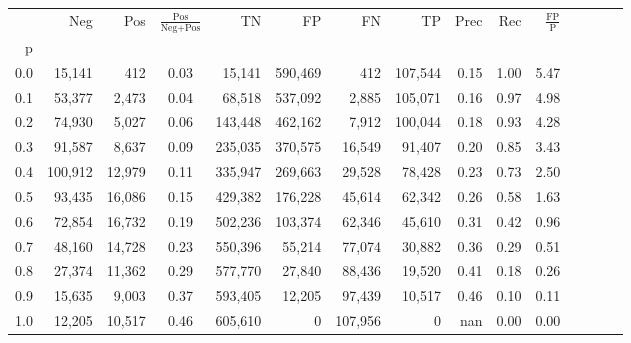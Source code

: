 \begin{tabular}{rrrcrrrrrrrrrrr}
\toprule
{} &      Neg &     Pos & $\frac{\text{Pos}}{\text{Neg}+\text{Pos}}$ &       TN &       FP &       FN &       TP &  Prec &   Rec & $\frac{\text{FP}}{\text{P}}$ \\
p   &          &         &                                            &          &          &          &          &       &       &                              \\
\midrule
0.0 &   15,141 &     412 &                                       0.03 &   15,141 &  590,469 &      412 &  107,544 &  0.15 &  1.00 &                         5.47 \\
0.1 &   53,377 &   2,473 &                                       0.04 &   68,518 &  537,092 &    2,885 &  105,071 &  0.16 &  0.97 &                         4.98 \\
0.2 &   74,930 &   5,027 &                                       0.06 &  143,448 &  462,162 &    7,912 &  100,044 &  0.18 &  0.93 &                         4.28 \\
0.3 &   91,587 &   8,637 &                                       0.09 &  235,035 &  370,575 &   16,549 &   91,407 &  0.20 &  0.85 &                         3.43 \\
0.4 &  100,912 &  12,979 &                                       0.11 &  335,947 &  269,663 &   29,528 &   78,428 &  0.23 &  0.73 &                         2.50 \\
0.5 &   93,435 &  16,086 &                                       0.15 &  429,382 &  176,228 &   45,614 &   62,342 &  0.26 &  0.58 &                         1.63 \\
0.6 &   72,854 &  16,732 &                                       0.19 &  502,236 &  103,374 &   62,346 &   45,610 &  0.31 &  0.42 &                         0.96 \\
0.7 &   48,160 &  14,728 &                                       0.23 &  550,396 &   55,214 &   77,074 &   30,882 &  0.36 &  0.29 &                         0.51 \\
0.8 &   27,374 &  11,362 &                                       0.29 &  577,770 &   27,840 &   88,436 &   19,520 &  0.41 &  0.18 &                         0.26 \\
0.9 &   15,635 &   9,003 &                                       0.37 &  593,405 &   12,205 &   97,439 &   10,517 &  0.46 &  0.10 &                         0.11 \\
1.0 &   12,205 &  10,517 &                                       0.46 &  605,610 &        0 &  107,956 &        0 &   nan &  0.00 &                         0.00 \\
\bottomrule
\end{tabular}
